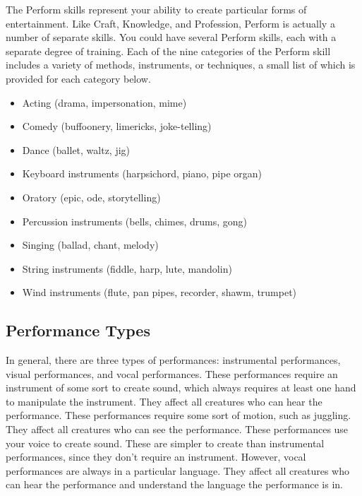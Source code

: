 \newpage
{}
    The Perform skills represent your ability to create particular forms of entertainment.
        Like Craft, Knowledge, and Profession, Perform is actually a number of separate skills.
        You could have several Perform skills, each with a separate degree of training.
        Each of the nine categories of the Perform skill includes a variety of methods, instruments, or techniques, a small list of which is provided for each category below.

        \begin{itemize}
            \item Acting (drama, impersonation, mime)
            \item Comedy (buffoonery, limericks, joke-telling)
            \item Dance (ballet, waltz, jig)
            \item Keyboard instruments (harpsichord, piano, pipe organ)
            \item Oratory (epic, ode, storytelling)
            \item Percussion instruments (bells, chimes, drums, gong)
            \item Singing (ballad, chant, melody)
            \item String instruments (fiddle, harp, lute, mandolin)
            \item Wind instruments (flute, pan pipes, recorder, shawm, trumpet)
        \end{itemize}

        \subsection{Performance Types}
            In general, there are three types of performances: instrumental performances, visual performances, and vocal performances.
             These performances require an instrument of some sort to create sound, which always requires at least one hand to manipulate the instrument.
            They affect all creatures who can hear the performance.
             These performances require some sort of motion, such as juggling.
            They affect all creatures who can see the performance.
             These performances use your voice to create sound.
            These are simpler to create than instrumental performances, since they don't require an instrument.
            However, vocal performances are always in a particular language.
            They affect all creatures who can hear the performance and understand the language the performance is in.

